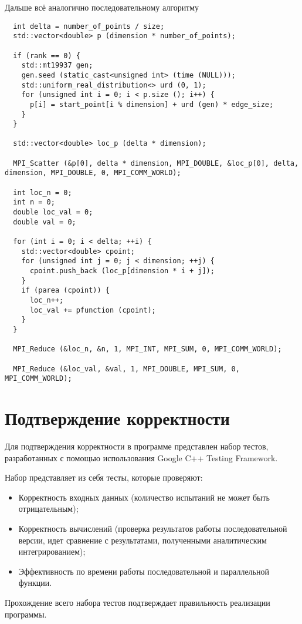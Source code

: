 \documentclass{report}
\begin{document}
Дальше всё аналогично последовательному алгоритму\begin{lstlisting}
  int delta = number_of_points / size;
  std::vector<double> p (dimension * number_of_points);

  if (rank == 0) {
    std::mt19937 gen;
    gen.seed (static_cast<unsigned int> (time (NULL)));
    std::uniform_real_distribution<> urd (0, 1);
    for (unsigned int i = 0; i < p.size (); i++) {
      p[i] = start_point[i % dimension] + urd (gen) * edge_size;
    }
  }

  std::vector<double> loc_p (delta * dimension);

  MPI_Scatter (&p[0], delta * dimension, MPI_DOUBLE, &loc_p[0], delta, dimension, MPI_DOUBLE, 0, MPI_COMM_WORLD);     

  int loc_n = 0;
  int n = 0;
  double loc_val = 0;
  double val = 0;

  for (int i = 0; i < delta; ++i) {
    std::vector<double> cpoint;
    for (unsigned int j = 0; j < dimension; ++j) {
      cpoint.push_back (loc_p[dimension * i + j]);
    }
    if (parea (cpoint)) {
      loc_n++;
      loc_val += pfunction (cpoint);
    }
  }

  MPI_Reduce (&loc_n, &n, 1, MPI_INT, MPI_SUM, 0, MPI_COMM_WORLD);  
 
  MPI_Reduce (&loc_val, &val, 1, MPI_DOUBLE, MPI_SUM, 0, MPI_COMM_WORLD);
 \end{lstlisting}
\newpage

\section*{Подтверждение корректности}
Для подтверждения корректности в программе представлен набор тестов, разработанных с помощью использования Google C++ Testing Framework.
\par Набор представляет из себя тесты, которые проверяют:
\begin{itemize}
\item Корректность входных данных (количество испытаний не может быть отрицательным);
\item Корректность вычислений (проверка результатов работы последовательной версии, идет сравнение с результатами, полученными аналитическим интегрированием);
\item Эффективность по времени работы последовательной и параллельной функции.
\end{itemize}
\par Прохождение всего набора тестов подтверждает правильность реализации программы.
\newpage
\end{document}
